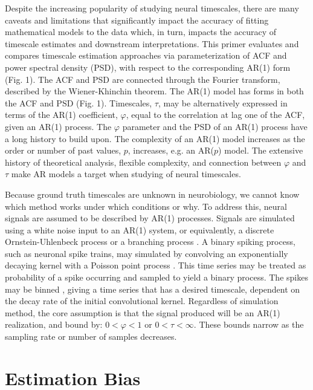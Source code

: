 \documentclass[pdflatex,sn-mathphys-num]{sn-jnl}
\begin{document}
Despite the increasing popularity of studying neural timescales, there are many caveats and limitations that significantly impact the accuracy of fitting mathematical models to the data which, in turn, impacts the accuracy of timescale estimates and downstream interpretations. This primer evaluates and compares timescale estimation approaches via parameterization of ACF and power spectral density (PSD), with respect to the corresponding AR(1) form (Fig. 1). The ACF and PSD are connected through the Fourier transform, described by the Wiener-Khinchin theorem. The AR(1) model has forms in both the ACF and PSD (Fig. 1). Timescales, $\tau$, may be alternatively expressed in terms of the AR(1) coefficient, $\varphi$, equal to the correlation at lag one of the ACF, given an AR(1) process. The $\varphi$ parameter and the PSD of an AR(1) process have a long history \cite{yule_1927, gilman_power_1963} to build upon. The complexity of an AR(1) model increases as the order or number of past values, $p$, increases, e.g. an AR($p$) model. The extensive history of theoretical analysis, flexible complexity, and connection between $\varphi$ and $\tau$ make AR models a target when studying of neural timescales.

Because ground truth timescales are unknown in neurobiology, we cannot know which method works under which conditions or why. To address this, neural signals are assumed to be described by AR(1) processes. Signals are simulated using a white noise input to an AR(1) system, or equivalently, a discrete Ornstein-Uhlenbeck process \cite{uhlenbeck_theory_1930} or a branching process \cite{zierenberg_description_2020}. A binary spiking process, such as neuronal spike trains, may simulated by convolving an exponentially decaying kernel with a Poisson point process \cite{meyer_inferring_2019}. This time series may be treated as probability of a spike occurring and sampled to yield a binary process. The spikes may be binned \cite{murray_hierarchy_2014}, giving a time series that has a desired timescale, dependent on the decay rate of the initial convolutional kernel. Regardless of simulation method, the core assumption is that the signal produced will be an AR(1) realization, and bound by: $0 < \varphi < 1$ or $0 < \tau < \infty$. These bounds narrow as the sampling rate or number of samples decreases.

\section{Estimation Bias}
\end{document}
